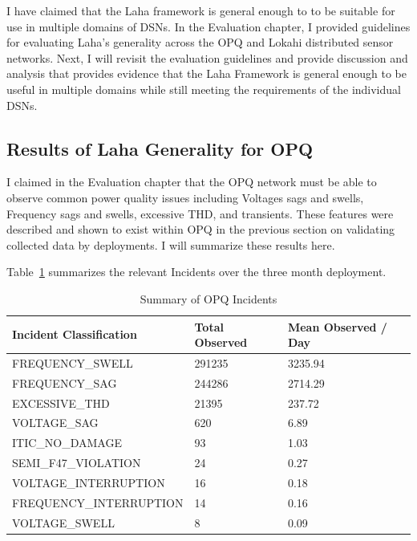 I have claimed that the Laha framework is general enough to to be suitable for use in multiple domains of DSNs. In the Evaluation chapter, I provided guidelines for evaluating Laha's generality across the OPQ and Lokahi distributed sensor networks. Next, I will revisit the evaluation guidelines and provide discussion and analysis that provides evidence that the Laha Framework is general enough to be useful in multiple domains while still meeting the requirements of the individual DSNs.

\subsection{Results of Laha Generality for OPQ}\label{subsec:results-of-laha-generality-for-opq}

I claimed in the Evaluation chapter that the OPQ network must be able to observe common power quality issues including Voltages sags and swells, Frequency sags and swells, excessive THD, and transients. These features were described and shown to exist within OPQ in the previous section on validating collected data by deployments. I will summarize these results here.

Table~\ref{table:incidents_summary} summarizes the relevant Incidents over the three month deployment.

\begin{table}[H]
    \centering
    \caption{Summary of OPQ Incidents}
    \begin{tabularx}{\textwidth}{Xll}
        \toprule
        \textbf{Incident Classification} & \textbf{Total Observed} & \textbf{Mean Observed / Day} \\
        \midrule
        FREQUENCY\_SWELL & 291235 & 3235.94 \\
        FREQUENCY\_SAG & 244286 & 2714.29 \\
        EXCESSIVE\_THD & 21395 & 237.72 \\
        VOLTAGE\_SAG & 620 & 6.89 \\
        ITIC\_NO\_DAMAGE & 93 & 1.03 \\
        SEMI\_F47\_VIOLATION & 24 & 0.27 \\
        VOLTAGE\_INTERRUPTION & 16 & 0.18 \\
        FREQUENCY\_INTERRUPTION & 14 & 0.16 \\
        VOLTAGE\_SWELL & 8 & 0.09 \\
        \bottomrule
    \end{tabularx}
    \label{table:incidents_summary}
\end{table}

